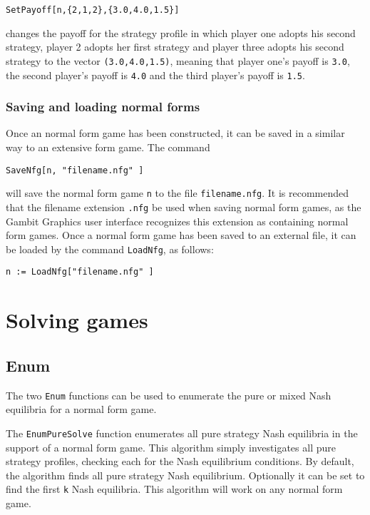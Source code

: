 \begin{verbatim}
SetPayoff[n,{2,1,2},{3.0,4.0,1.5}]
\end{verbatim}

\noindent
changes the payoff for the strategy profile in which player one adopts
his second strategy, player 2 adopts her first strategy and player
three adopts his second strategy to the vector \verb+(3.0,4.0,1.5)+,
meaning that player one's payoff is \verb+3.0+, the second player's
payoff is \verb+4.0+ and the third player's payoff is \verb+1.5+.

\subsubsection{Saving and loading normal forms}

Once an normal form game has been constructed, it can be saved in a
similar way to an extensive form game.  The command 

\begin{verbatim}
SaveNfg[n, "filename.nfg" ]
\end{verbatim}

\noindent
will save the normal form game \verb+n+ to the file
\verb+filename.nfg+.  It is recommended that the
filename extension \verb+.nfg+ be used when saving normal form games, as
the Gambit Graphics user interface recognizes this extension as
containing normal form games.  Once a normal form game has been
saved to an external file, it can be loaded by the command
\verb+LoadNfg+, as follows:

\begin{verbatim}
n := LoadNfg["filename.nfg" ]
\end{verbatim}

\section{Solving games}

\subsection{Enum}

The two {\tt Enum} functions can be used to enumerate the pure or
mixed Nash equilibria for a normal form game. 

The {\tt EnumPureSolve} function enumerates all pure strategy Nash
equilibria in the support of a normal form game.  This
algorithm simply investigates all pure strategy profiles, checking
each for the Nash equilibrium conditions.  By default, the algorithm
finds all pure strategy Nash equilibrium.  Optionally it can be set to
find the first \verb+k+ Nash equilibria.  This algorithm will work on
any normal form game.  

